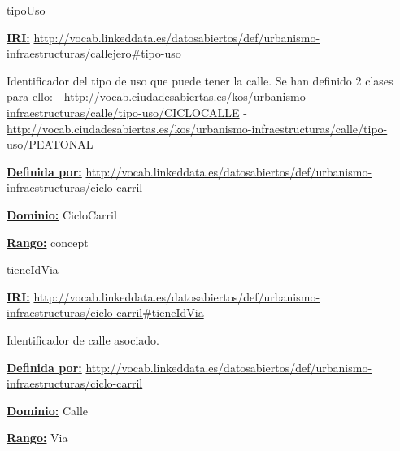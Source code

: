\begin{mybox}{tipoUso}
\begin{flushleft}
\underline{\textbf{IRI:}}
\url{http://vocab.linkeddata.es/datosabiertos/def/urbanismo-infraestructuras/callejero#tipo-uso}
\newline

Identificador del tipo de uso que puede tener la calle. Se han definido 2 clases para ello:
\newline -	\url{http://vocab.ciudadesabiertas.es/kos/urbanismo-infraestructuras/calle/tipo-uso/CICLOCALLE}
\newline -	 \url{http://vocab.ciudadesabiertas.es/kos/urbanismo-infraestructuras/calle/tipo-uso/PEATONAL}
\newline


\underline{\textbf{Definida por:}}
\url{http://vocab.linkeddata.es/datosabiertos/def/urbanismo-infraestructuras/ciclo-carril}
\newline

\underline{\textbf{Dominio:}}
\newline CicloCarril

\underline{\textbf{Rango:}}
		concept


\end{flushleft}
\end{mybox}






\begin{mybox}{tieneIdVia}
\begin{flushleft}
\underline{\textbf{IRI:}}
\url{http://vocab.linkeddata.es/datosabiertos/def/urbanismo-infraestructuras/ciclo-carril#tieneIdVia}
\newline

Identificador de calle asociado.
\newline

\underline{\textbf{Definida por:}}
\url{http://vocab.linkeddata.es/datosabiertos/def/urbanismo-infraestructuras/ciclo-carril}
\newline

\underline{\textbf{Dominio:}}
		Calle
\newline

\underline{\textbf{Rango:}}
		Via
\newline


\end{flushleft}
\end{mybox}





